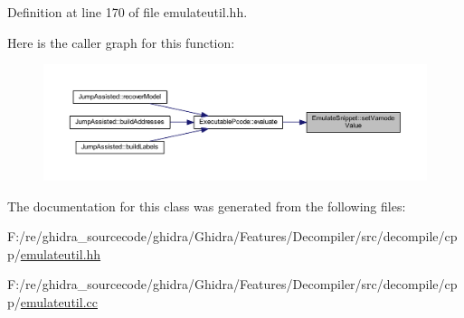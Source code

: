 Definition at line 170 of file emulateutil.\+hh.

Here is the caller graph for this function\+:
\nopagebreak
\begin{figure}[H]
\begin{center}
\leavevmode
\includegraphics[width=350pt]{class_emulate_snippet_abc4c1bf018f8ab3c0cea77fa927f5968_icgraph}
\end{center}
\end{figure}


The documentation for this class was generated from the following files\+:\begin{DoxyCompactItemize}
\item 
F\+:/re/ghidra\+\_\+sourcecode/ghidra/\+Ghidra/\+Features/\+Decompiler/src/decompile/cpp/\mbox{\hyperlink{emulateutil_8hh}{emulateutil.\+hh}}\item 
F\+:/re/ghidra\+\_\+sourcecode/ghidra/\+Ghidra/\+Features/\+Decompiler/src/decompile/cpp/\mbox{\hyperlink{emulateutil_8cc}{emulateutil.\+cc}}\end{DoxyCompactItemize}
